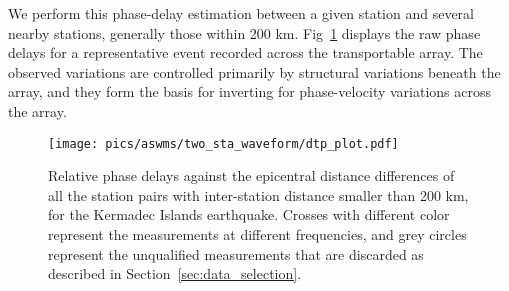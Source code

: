 
We perform this phase-delay estimation between a given station and several nearby stations, generally those within 200 km.  Fig~\ref{fig:dtp} displays the raw phase delays for a representative event recorded across the transportable array. The observed variations are controlled primarily by structural variations beneath the array, and they form the basis for inverting for phase-velocity variations across the array.  

\begin{figure}
	\center
	\texttt{[image: pics/aswms/two\_sta\_waveform/dtp\_plot.pdf]}
	\caption[Relative phase delays against the epicentral distance differences]{Relative phase delays against the epicentral distance differences of all the station pairs with inter-station distance smaller than 200 km, for the Kermadec Islands earthquake. Crosses with different color represent the measurements at different frequencies, and grey circles represent the unqualified measurements that are discarded as described in Section~\ref{sec:data_selection}.}
	\label{fig:dtp}
\end{figure}

